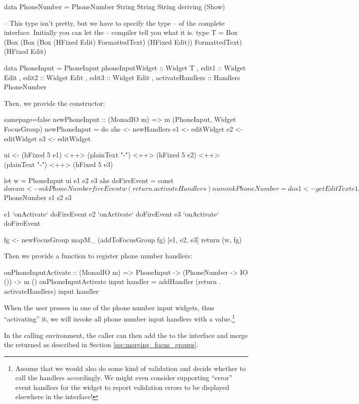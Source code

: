 \begin{haskellcode}
 data PhoneNumber = PhoneNumber String String String
                    deriving (Show)

 -- This type isn't pretty, but we have to specify the type
 -- of the complete interface.  Initially you can let the
 -- compiler tell you what it is.
 type T = Box (Box
               (Box (Box (HFixed Edit) FormattedText) (HFixed Edit))
               FormattedText) (HFixed Edit)

 data PhoneInput =
   PhoneInput { phoneInputWidget :: Widget T
              , edit1 :: Widget Edit
              , edit2 :: Widget Edit
              , edit3 :: Widget Edit
              , activateHandlers :: Handlers PhoneNumber
              }
\end{haskellcode}

Then, we provide the constructor:

\begin{haskellcode*}{samepage=false}
 newPhoneInput :: (MonadIO m) => m (PhoneInput, Widget FocusGroup)
 newPhoneInput = do
   ahs <- newHandlers
   e1 <- editWidget
   e2 <- editWidget
   e3 <- editWidget

   ui <- (hFixed 5 e1) <++>
         (plainText "-") <++>
         (hFixed 5 e2) <++>
         (plainText "-") <++>
         (hFixed 5 e3)

   let w = PhoneInput ui e1 e2 e3 ahs
       doFireEvent = const $ do
         num <- mkPhoneNumber
         fireEvent w (return . activateHandlers) num

       mkPhoneNumber = do
         s1 <- getEditText e1
         s2 <- getEditText e2
         s3 <- getEditText e3
         return $ PhoneNumber s1 s2 s3

   e1 `onActivate` doFireEvent
   e2 `onActivate` doFireEvent
   e3 `onActivate` doFireEvent

   fg <- newFocusGroup
   mapM_ (addToFocusGroup fg) [e1, e2, e3]
   return (w, fg)
\end{haskellcode*}

Then we provide a function to register phone number handlers:

\begin{haskellcode}
 onPhoneInputActivate :: (MonadIO m) => PhoneInput
                      -> (PhoneNumber -> IO ()) -> m ()
 onPhoneInputActivate input handler =
   addHandler (return . activateHandlers) input handler
\end{haskellcode}

When the user presses  in one of the phone number input
widgets, thus ``activating'' it, we will invoke all phone number input
handlers with a  value.\footnote{Assume that we would
  also do some kind of validation and decide whether to call the
  handlers accordingly.  We might even consider supporting ``error''
  event handlers for the widget to report validation errors to be
  displayed elsewhere in the interface!}

In the calling environment, the caller can then add the
 to the interface and merge the returned
 as described in Section
\ref{sec:merging_focus_groups}.
